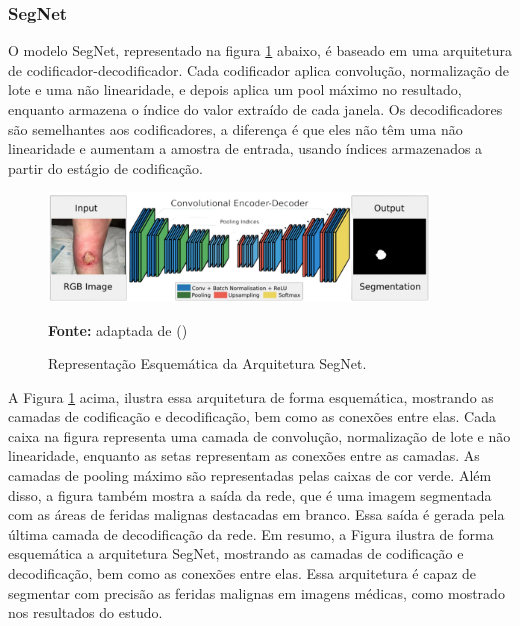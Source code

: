     
    \subsubsection{SegNet}

        O modelo \ac{SegNet}, representado na figura \ref{fig:arquiteturaSegNet} abaixo,  é baseado em uma arquitetura de codificador-decodificador. Cada codificador aplica convolução, normalização de lote e uma não linearidade, e depois aplica um pool máximo no resultado, enquanto armazena o índice do valor extraído de cada janela. Os decodificadores são semelhantes aos codificadores, a diferença é que eles não têm uma não linearidade e aumentam a amostra de entrada, usando índices armazenados a partir do estágio de codificação.

        \clearpage

        \begin{figure}[htbp]
            \centering
            \caption{Representação Esquemática da Arquitetura \ac{SegNet}.}
            \includegraphics[width=0.9\textwidth]{img/arquitetura_Seg-Net.png}
            \label{fig:arquiteturaSegNet}
            \par\medskip\textbf{Fonte:} adaptada de (\cite{badrinarayanan2017deep})
        \end{figure}

            A Figura \ref{fig:arquiteturaSegNet} acima, ilustra essa arquitetura de forma esquemática, mostrando as camadas de codificação e decodificação, bem como as conexões entre elas. Cada caixa na figura representa uma camada de convolução, normalização de lote e não linearidade, enquanto as setas representam as conexões entre as camadas. As camadas de pooling máximo são representadas pelas caixas de cor verde. Além disso, a figura também mostra a saída da rede, que é uma imagem segmentada com as áreas de feridas malignas destacadas em branco. Essa saída é gerada pela última camada de decodificação da rede.
            Em resumo, a Figura ilustra de forma esquemática a arquitetura \ac{SegNet}, mostrando as camadas de codificação e decodificação, bem como as conexões entre elas. Essa arquitetura é capaz de segmentar com precisão as feridas malignas em imagens médicas, como mostrado nos resultados do estudo.

